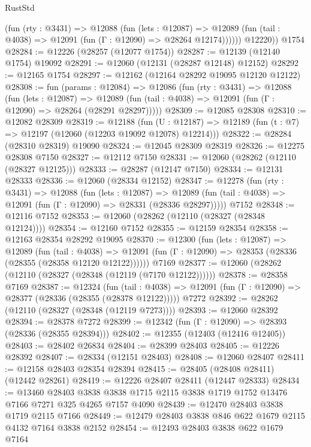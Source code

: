 \begin{lexlean}{RustStd}
\begin{coremodule}
            (fun (rty : @3431) =>
            @12088
              (fun (lets : @12087) =>
              @12089 (fun (tail : @4038) => @12091 (fun (Γ : @12090) => @28264 @12174))))))
        @12220))
    @1754
@28284 := @12226 (@28257 (@12077 @1754))
@28287 := @12139 (@12140 @1754) @19092
@28291 := @12060 (@12131 (@28287 @12148) @12152)
@28292 := @12165 @1754
@28297 := @12162 (@12164 @28292 @19095 @12120 @12122)
@28308 := fun (params : @12084) =>
  @12086
    (fun (rty : @3431) =>
    @12088
      (fun (lets : @12087) =>
      @12089 (fun (tail : @4038) => @12091 (fun (Γ : @12090) => @28264 (@28291 @28297)))))
@28309 := @12085 @28308
@28310 := @12082 @28309
@28319 := @12188
    (fun (U : @12187) => @12189 (fun (t : @7) => @12197 (@12060 (@12203 @19092 @12078) @12214)))
@28322 := @28284 (@28310 @28319) @19090
@28324 := @12045 @28309 @28319
@28326 := @12275 @28308 @7150
@28327 := @12112 @7150
@28331 := @12060 (@28262 (@12110 (@28327 @12125)))
@28333 := @28287 (@12147 @7150)
@28334 := @12131 @28333
@28336 := @12060 (@28334 @12152)
@28347 := @12278
    (fun (rty : @3431) =>
    @12088
      (fun (lets : @12087) =>
      @12089 (fun (tail : @4038) => @12091 (fun (Γ : @12090) => @28331 (@28336 @28297)))))
    @7152
@28348 := @12116 @7152
@28353 := @12060 (@28262 (@12110 (@28327 (@28348 @12124))))
@28354 := @12160 @7152
@28355 := @12159 @28354
@28358 := @12163 @28354 @28292 @19095
@28370 := @12300
    (fun (lets : @12087) =>
    @12089
      (fun (tail : @4038) =>
      @12091 (fun (Γ : @12090) => @28353 (@28336 (@28355 (@28358 @12120 @12122))))))
    @7169
@28377 := @12060 (@28262 (@12110 (@28327 (@28348 (@12119 (@7170 @12122))))))
@28378 := @28358 @7169
@28387 := @12324
    (fun (tail : @4038) => @12091 (fun (Γ : @12090) => @28377 (@28336 (@28355 (@28378 @12122)))))
    @7272
@28392 := @28262 (@12110 (@28327 (@28348 (@12119 @7273))))
@28393 := @12060 @28392
@28394 := @28378 @7272
@28399 := @12342 (fun (Γ : @12090) => @28393 (@28336 (@28355 @28394)))
@28402 := @12355 (@12403 (@12416 @12405))
@28403 := @28402 @26834
@28404 := @28399 @28403
@28405 := @12226 @28392
@28407 := @28334 (@12151 @28403)
@28408 := @12060 @28407
@28411 := @12158 @28403 @28354 @28394
@28415 := @28405 (@28408 @28411) (@12442 @28261)
@28419 := @12226 @28407 @28411 (@12447 @28333)
@28434 := @13460
    @28403
    @3838
    @3838
    @1715
    @2115
    @3838
    @1719
    @1752
    @13476
    @7166
    @7271
    @325
    @4265
    @7157
    @4090
@28439 := @12470 @28403 @3838 @1719 @2115 @7166
@28449 := @12479 @28403 @3838 @846 @622 @1679 @2115 @4132 @7164 @3838 @2152
@28454 := @12493 @28403 @3838 @622 @1679 @7164

\end{coremodule}
\end{lexlean}
